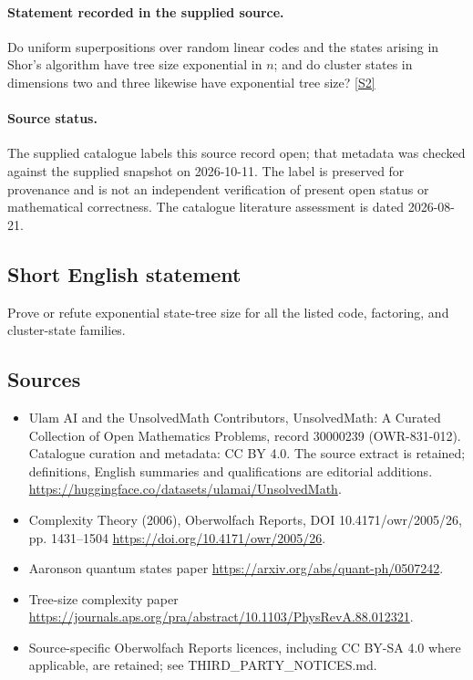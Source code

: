 \documentclass[11pt]{article}
\begin{document}
\paragraph{Statement recorded in the supplied source.}
Do uniform superpositions over random linear codes and the states arising in Shor's algorithm have tree size exponential in $n$; and do cluster states in dimensions two and three likewise have exponential tree size? \href{https://doi.org/10.4171/owr/2005/26}{[S2]}
\paragraph{Source status.}
The supplied catalogue labels this source record open; that metadata was checked against the supplied snapshot on 2026-10-11. The label is preserved for provenance and is not an independent verification of present open status or mathematical correctness. The catalogue literature assessment is dated 2026-08-21.
\subsection{Short English statement}
Prove or refute exponential state-tree size for all the listed code, factoring, and cluster-state families.
\subsection{Sources}
\begin{itemize}
\item[S1] Ulam AI and the UnsolvedMath Contributors, UnsolvedMath: A Curated Collection of Open Mathematics Problems, record 30000239 (OWR-831-012). Catalogue curation and metadata: CC BY 4.0. The source extract is retained; definitions, English summaries and qualifications are editorial additions.
\url{https://huggingface.co/datasets/ulamai/UnsolvedMath}.
\item[S2] Complexity Theory (2006), Oberwolfach Reports, DOI 10.4171/owr/2005/26, pp. 1431--1504
\url{https://doi.org/10.4171/owr/2005/26}.
\item[S3] Aaronson quantum states paper
\url{https://arxiv.org/abs/quant-ph/0507242}.
\item[S4] Tree-size complexity paper
\url{https://journals.aps.org/pra/abstract/10.1103/PhysRevA.88.012321}.
\item Source-specific Oberwolfach Reports licences, including CC BY-SA 4.0 where applicable, are retained; see THIRD\_PARTY\_NOTICES.md.
\end{itemize}
\end{document}

